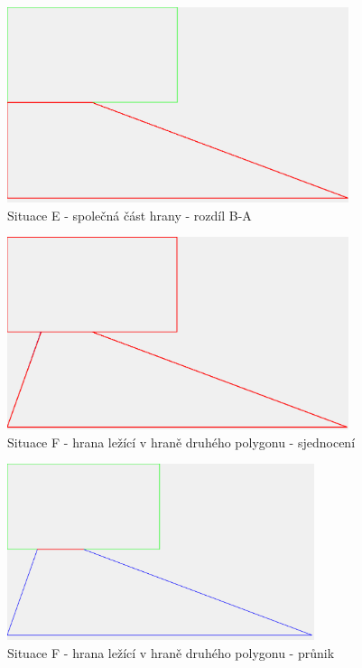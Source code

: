 \documentclass[a4paper,11pt,twoside]{article}
\begin{document}
\vspace{0.2cm}
\begin{figure}[hbt!] 
\begin{center}
\includegraphics[width=10cm]{pictures/E_diffBA.png} 
\caption[Situace E - společná část hrany - rozdíl B-A]{Situace E - společná část hrany - rozdíl B-A}
\label{fig:E_diffBA}
\end{center}
\end{figure}

\vspace{0.2cm}
\begin{figure}[hbt!] 
\begin{center}
\includegraphics[width=10cm]{pictures/F_union.png} 
\caption[Situace F - hrana ležící v hraně druhého polygonu - sjednocení]{Situace F - hrana ležící v hraně druhého polygonu - sjednocení}
\label{fig:F_union}
\end{center}
\end{figure}

\vspace{0.2cm}
\begin{figure}[hbt!] 
\begin{center}
\includegraphics[width=9cm]{pictures/F_intersect.png} 
\caption[Situace F - hrana ležící v hraně druhého polygonu - průnik]{Situace F - hrana ležící v hraně druhého polygonu - průnik}
\label{fig:F_intersect}
\end{center}
\end{figure}
\end{document}
